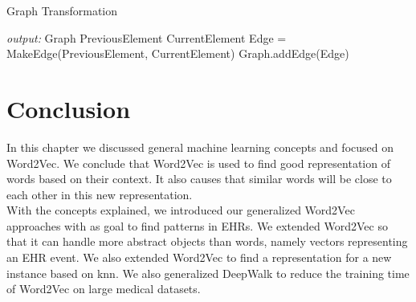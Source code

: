 \begin{algorithm}
\caption{Graph Transformation}
\label{alg:graphTrans}
\begin{algorithmic}[1]

\State \textit{output: } Graph
		\State PreviousElement
		\State CurrentElement
		\State Edge = MakeEdge(PreviousElement, CurrentElement)
		\State Graph.addEdge(Edge)
	\EndFor
\EndFor

\end{algorithmic}
\end{algorithm}

\section{Conclusion}
In this chapter we discussed general machine learning concepts and focused on Word2Vec. We conclude that Word2Vec is used to find good representation of words based on their context. It also causes that similar words will be close to each other in this new representation. \\

With the concepts explained, we introduced our generalized Word2Vec approaches with as goal to find patterns in EHRs. We extended Word2Vec so that it can handle more abstract objects than words, namely vectors representing an EHR event. We also extended Word2Vec to find a representation for a new instance based on knn. We also generalized DeepWalk to reduce the training time of Word2Vec on large medical datasets.



